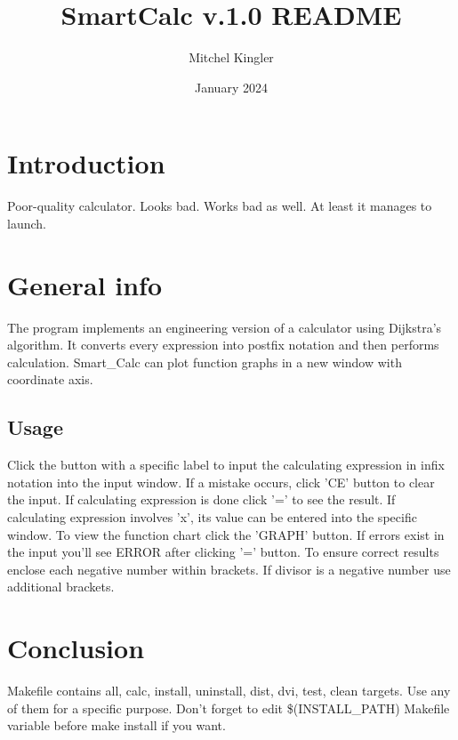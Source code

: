 \documentclass{article}
\title{SmartCalc v.1.0 README}
\author{Mitchel Kingler}
\date{January 2024}
\begin{document}
\maketitle

\section{Introduction}
Poor-quality calculator. Looks bad. Works bad as well. At least it manages to launch.

\section{General info}
The program implements an engineering version of a calculator using Dijkstra's algorithm. 
It converts every expression into postfix notation and then performs calculation.
Smart\_Calc can plot function graphs in a new window with coordinate axis.

\subsection{Usage}
Click the button with a specific label to input the calculating expression in infix notation into the input window. 
If a mistake occurs, click 'CE' button to clear the input. If calculating expression is done click '=' to see the result.
If calculating expression involves 'x', its value can be entered into the specific window. To view the function chart click the 'GRAPH' button.
If errors exist in the input you'll see ERROR after clicking '=' button. To ensure correct results enclose each negative number within brackets.
If divisor is a negative number use additional brackets.

\section{Conclusion}
Makefile contains all, calc, install, uninstall, dist, dvi, test, clean targets. Use any of them for a specific purpose. Don't forget to edit 
\$(INSTALL\_PATH) Makefile variable before make install if you want. 
\end{document}
